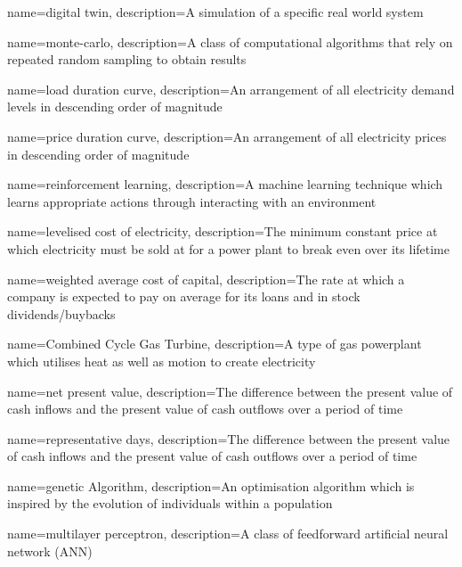 {
	name=digital twin,
	description={A simulation of a specific real world system}
}


{
	name=monte-carlo,
	description={A class of computational algorithms that rely on repeated random sampling to obtain results}
}



{
	name=load duration curve,
	description={An arrangement of all electricity demand levels in descending order of magnitude}
}




{
	name=price duration curve,
	description={An arrangement of all electricity prices in descending order of magnitude}
}


{
	name=reinforcement learning,
	description={A machine learning technique which learns appropriate actions through interacting with an environment}
}



{
	name=levelised cost of electricity,
	description={The minimum constant price at which electricity must be sold at for a power plant to break even over its lifetime}
}



{
	name=weighted average cost of capital,
	description={The rate at which a company is expected to pay on average for its loans and in stock dividends/buybacks}
}


{
	name=Combined Cycle Gas Turbine,
	description={A type of gas powerplant which utilises heat as well as motion to create electricity}
}



{
	name=net present value,
	description={The difference between the present value of cash inflows and the present value of cash outflows over a period of time}
}


{
	name=representative days,
	description={The difference between the present value of cash inflows and the present value of cash outflows over a period of time}
}


{
	name=genetic Algorithm,
	description={An optimisation algorithm which is inspired by the evolution of individuals within a population}
}



{
	name=multilayer perceptron,
	description={A class of feedforward artificial neural network (ANN)}
}


